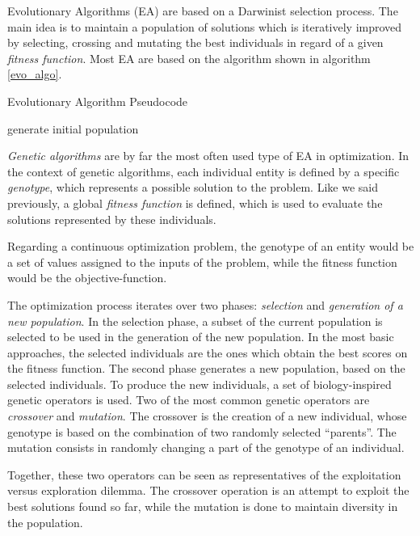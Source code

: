 Evolutionary Algorithms (EA) are based on a Darwinist selection process. The main idea is to maintain a population of solutions which is iteratively improved by selecting, crossing and mutating the best individuals in regard of a given \emph{fitness function}. Most EA are based on the algorithm shown in algorithm \ref{evo_algo}.

\begin{algorithm}
\caption{Evolutionary Algorithm Pseudocode}
\label{evo_algo}

	generate initial population\;
\end{algorithm}

\emph{Genetic algorithms} \cite{holland1992adaptation} are by far the most often used type of EA in optimization. In the context of genetic algorithms, each individual entity is defined by a specific \emph{genotype}, which represents a possible solution to the problem.
Like we said previously, a global \emph{fitness function} is defined, which is used to evaluate the solutions represented by these individuals.

Regarding a continuous optimization problem, the genotype of an entity would be a set of values assigned to the inputs of the problem, while the fitness function would be the objective-function.

The optimization process iterates over two phases: \emph{selection} and \emph{generation of a new population}.
In the selection phase, a subset of the current population is selected to be used in the generation of the new population. In the most basic approaches, the selected individuals are the ones which obtain the best scores on the fitness function.
The second phase generates a new population, based on the selected individuals. To produce the new individuals, a set of biology-inspired genetic operators is used. Two of the most common genetic operators are \emph{crossover} and \emph{mutation}. The crossover is the creation of a new individual, whose genotype is based on the combination of two randomly selected \enquote{parents}. The mutation consists in randomly changing a part of the genotype of an individual.

Together, these two operators can be seen as representatives of the exploitation versus exploration dilemma. The crossover operation is an attempt to exploit the best solutions found so far, while the mutation is done to maintain diversity in the population. 

